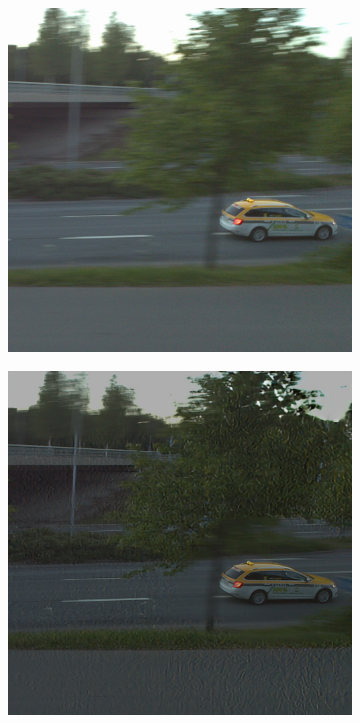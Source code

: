 \documentclass[10pt,twocolumn,letterpaper]{article}
\begin{document}
\begin{figure}[h]
  \centering
  \begin{subfigure}{.5\columnwidth}
    \centering
    \includegraphics[width=\linewidth]{images/car.png}
  \end{subfigure}%
  \hfill
  \begin{subfigure}{.5\columnwidth}
    \centering
    \includegraphics[width=\linewidth]{images/car_dg.png}
  \end{subfigure}%
  \hfill
\end{figure}
\end{document}
